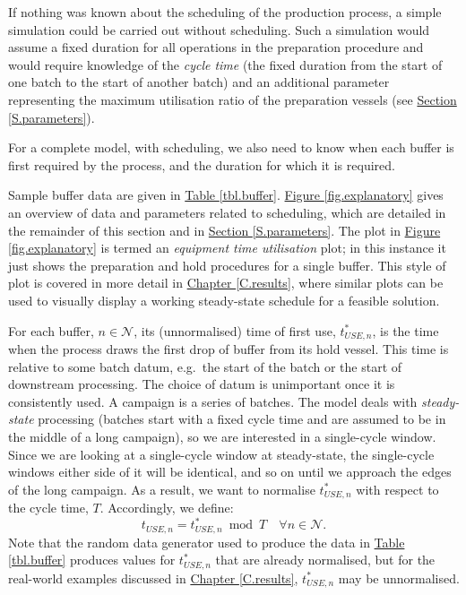If nothing was known about the scheduling of the production process, a simple
simulation could be carried out without scheduling.
Such a simulation would assume a fixed duration for all operations in the
preparation procedure and would require knowledge of the \emph{cycle time} (the
fixed duration from the start of one batch to the start of another batch) and
an additional parameter representing the maximum utilisation ratio of the
preparation vessels (see \hyperref[S.parameters]{Section \ref*{S.parameters}}).

For a complete model, with scheduling, we also need to know when each buffer
is first required by the process, and the duration for which it is required.

Sample buffer data are given in \hyperref[tbl.buffer]{Table \ref*{tbl.buffer}}.
\hyperref[fig.explanatory]{Figure \ref*{fig.explanatory}} gives an overview of
data and parameters related to scheduling, which are detailed in the remainder
of this section and in \hyperref[S.parameters]{Section \ref*{S.parameters}}.
The plot in \hyperref[fig.explanatory]{Figure \ref*{fig.explanatory}} is
termed an \emph{equipment time utilisation} plot; in this instance it just
shows the preparation and hold procedures for a single buffer.
This style of plot is covered in more detail in
\hyperref[C.results]{Chapter \ref*{C.results}}, where similar plots can be used
to visually display a working steady-state schedule for a feasible solution.

For each buffer, $n \in \mathcal{N}$, its (unnormalised) time of first use,
$t_{\mathit{USE},n}^{*}$, is the time when the process draws the first drop of
buffer from its hold vessel.
This time is relative to some batch datum, e.g.\ the start of the batch or the
start of downstream processing.
The choice of datum is unimportant once it is consistently used.
A campaign is a series of batches. 
The model deals with \emph{steady-state} processing (batches start with a fixed
cycle time and are assumed to be in the middle of a long campaign), so we are
interested in a single-cycle window.
Since we are looking at a single-cycle window at steady-state, the single-cycle
windows either side of it will be identical, and so on until we approach the
edges of the long campaign.
As a result, we want to normalise $t_{\mathit{USE},n}^{*}$ with respect to the
cycle time, $T$.
Accordingly, we define:
\begin{equation}
    t_{\mathit{USE},n} = t_{\mathit{USE},n}^{*} \enspace \text{mod} \enspace 
    T \quad \forall n \in \mathcal{N}.
\end{equation}
Note that the random data generator used to produce the data in 
\hyperref[tbl.buffer]{Table \ref*{tbl.buffer}} produces values for 
$t_{\mathit{USE},n}^{*}$ that are already normalised, but for the real-world
examples discussed in \hyperref[C.results]{Chapter \ref*{C.results}}, 
$t_{\mathit{USE},n}^{*}$ may be unnormalised.

